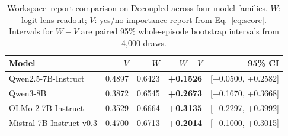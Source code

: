 \begin{table}[tbp]
\centering
\caption{Workspace--report comparison on Decoupled across four model families. $W$: logit-lens readout; $V$: yes/no importance report from Eq.~\eqref{eq:score}. Intervals for $W{-}V$ are paired 95\% whole-episode bootstrap intervals from 4,000 draws.}
\label{tab:crossfamily}
\small
\setlength{\tabcolsep}{4.5pt}
\begin{tabular}{lrrrr}
\toprule
Model & $V$ & $W$ & $W{-}V$ & 95\% CI \\
\midrule
Qwen2.5-7B-Instruct & 0.4897 & 0.6423 & \textbf{+0.1526} & [+0.0500, +0.2582] \\
Qwen3-8B & 0.3872 & 0.6545 & \textbf{+0.2673} & [+0.1670, +0.3668] \\
OLMo-2-7B-Instruct & 0.3529 & 0.6664 & \textbf{+0.3135} & [+0.2297, +0.3992] \\
Mistral-7B-Instruct-v0.3 & 0.4700 & 0.6713 & \textbf{+0.2014} & [+0.1000, +0.3015] \\
\bottomrule
\end{tabular}
\end{table}
